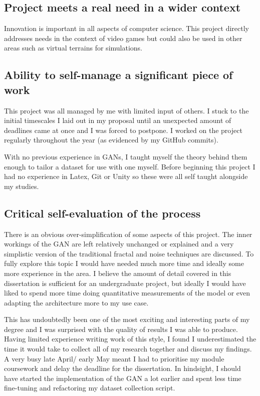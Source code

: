 \documentclass[a4paper]{report}
\begin{document}
\subsection{Project meets a real need in a wider context}
Innovation is important in all aspects of computer science. This project directly addresses needs in the context of video games but could also be used in other areas such as virtual terrains for simulations.
\subsection{Ability to self-manage a significant piece of work}
This project was all managed by me with limited input of others. I stuck to the initial timescales I laid out in my proposal until an unexpected amount of deadlines came at once and I was forced to postpone. I worked on the project regularly throughout the year (as evidenced by my GitHub commits).

With no previous experience in GANs, I taught myself the theory behind them enough to tailor a dataset for use with one myself. Before beginning this project I had no experience in Latex, Git or Unity so these were all self taught alongside my studies.
\subsection{Critical self-evaluation of the process}
There is an obvious over-simplification of some aspects of this project. The inner workings of the GAN are left relatively unchanged or explained and a very simplistic version of the traditional fractal and noise techniques are discussed. To fully explore this topic I would have needed much more time and ideally some more experience in the area. I believe the amount of detail covered in this dissertation is sufficient for an undergraduate project, but ideally I would have liked to spend more time doing quantitative measurements of the model or even adapting the architecture more to my use case.

This has undoubtedly been one of the most exciting and interesting parts of my degree and I was surprised with the quality of results I was able to produce. Having limited experience writing work of this style, I found I underestimated the time it would take to collect all of my research together and discuss my findings. A very busy late April/ early May meant I had to prioritise my module coursework and delay the deadline for the dissertation. In hindsight, I should have started the implementation of the GAN a lot earlier and spent less time fine-tuning and refactoring my dataset collection script.
\end{document}
